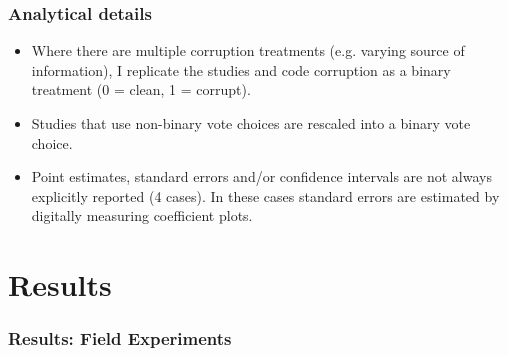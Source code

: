 \documentclass[usenames,dvipsnames]{beamer}
\begin{document}
\begin{frame}
\frametitle{Analytical details}
\begin{itemize}
\item Where there are multiple corruption treatments (e.g. varying source of information), I replicate the studies and code corruption as a binary treatment (0 = clean, 1 = corrupt).
\pause
\item Studies that use non-binary vote choices are rescaled into a binary vote choice.
\pause
\item Point estimates, standard errors and/or confidence intervals are not always explicitly reported (4 cases). In these cases standard errors are estimated by digitally measuring coefficient plots.
\end{itemize}

\end{frame}


\section{Results}

\begin{frame}
\frametitle{Results: Field Experiments}


\end{frame}

\end{document}
